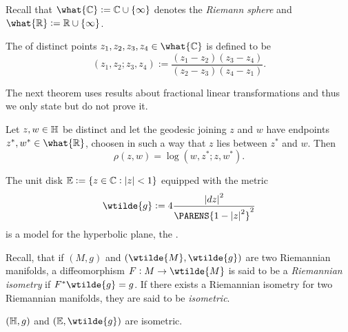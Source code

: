 Recall that $\what{\Cbb} := \Cbb \cup \cbr[0]{\infty}$ denotes the \emph{Riemann sphere} and $\what{\Rbb} := \Rbb \cup \cbr[0]{\infty}$.

\begin{definition}
	The  of distinct points $z_1,z_2,z_3,z_4 \in \what{\Cbb}$ is defined to be
	\begin{equation}
		(z_1,z_2;z_3,z_4) := \frac{(z_1 - z_2)(z_3 - z_4)}{(z_2 - z_3)(z_4 - z_1)}.
	\end{equation}
\end{definition}

The next theorem uses results about fractional linear transformations and thus we only state but do not prove it.

\begin{theorem}
	Let $z,w \in \mathbb{H}$ be distinct and let the geodesic joining $z$ and $w$ have endpoints $z^*,w^* \in \what{\Rbb}$, choosen in such a way that $z$ lies between $z^*$ and $w$. Then
	\begin{equation}
		\rho(z,w) = \log (w,z^*;z,w^*).
	\end{equation}
\end{theorem}

\begin{definition}
	The unit disk $\Ebb := \cbr[0]{z \in \Cbb : \abs[0]{z} < 1}$ equipped with the metric
	\begin{equation}
		\wtilde{g} := 4\frac{\abs[0]{dz}^2}{\PARENS{1 - \abs[0]{z}^2}^2}
	\end{equation}
	\noindent is a model for the hyperbolic plane, the .
\end{definition}

Recall, that if $(M,g)$ and $(\wtilde{M},\wtilde{g})$ are two Riemannian manifolds, a diffeomorphism $F : M \to \wtilde{M}$ is said to be a \emph{Riemannian isometry} if $F^* \wtilde{g} = g$. If there exists a Riemannian isometry for two Riemannian manifolds, they are said to be \emph{isometric}.

\begin{proposition}
	$(\mathbb{H}, g)$ and $(\Ebb, \wtilde{g})$ are isometric.
\end{proposition}

